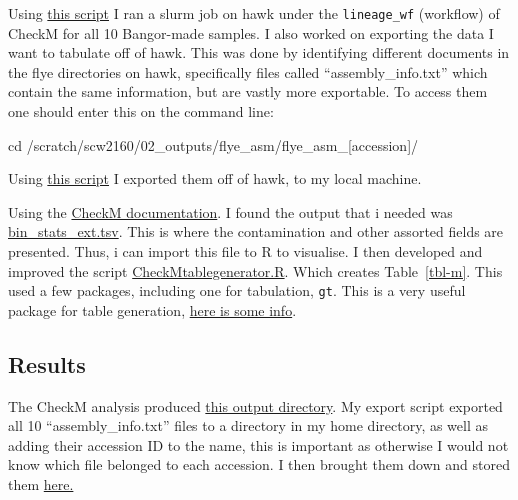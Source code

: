 \documentclass[
  letterpaper,
  DIV=11,
  numbers=noendperiod]{scrreprt}
\begin{document}
Using
\href{https://github.com/tobiasnunn/tnunn_research/blob/6be0be8a1de6b7fd64de79c280d9641f68a0e37c/00_scripts/checkmtest.sh}{this
script} I ran a slurm job on hawk under the \texttt{lineage\_wf}
(workflow) of CheckM for all 10 Bangor-made samples. I also worked on
exporting the data I want to tabulate off of hawk. This was done by
identifying different documents in the flye directories on hawk,
specifically files called ``assembly\_info.txt'' which contain the same
information, but are vastly more exportable. To access them one should
enter this on the command line:

cd /scratch/scw2160/02\_outputs/flye\_asm/flye\_asm\_{[}accession{]}/

Using
\href{https://github.com/tobiasnunn/tnunn_research/blob/6be0be8a1de6b7fd64de79c280d9641f68a0e37c/00_scripts/assemblytabledatagetter.sh}{this
script} I exported them off of hawk, to my local machine.

Using the
\href{https://github.com/Ecogenomics/CheckM/wiki/Genome-Quality-Commands\#qa}{CheckM
documentation}. I found the output that i needed was
\href{https://github.com/tobiasnunn/tnunn_research/blob/0ce45bbddc271c477204cfc7c6d488a9d1d95a87/02_middle-analysis_outputs/CheckM/storage/bin_stats_ext.tsv}{bin\_stats\_ext.tsv}.
This is where the contamination and other assorted fields are presented.
Thus, i can import this file to R to visualise. I then developed and
improved the script
\href{https://github.com/tobiasnunn/tnunn_research/blob/60126045c5802ef0627e86df57e7b533ff568e9d/00_scripts/CheckMtablegenerator.R}{CheckMtablegenerator.R}.
Which creates Table~\ref{tbl-m}. This used a few packages, including one
for tabulation, \texttt{gt}. This is a very useful package for table
generation, \href{https://gt.rstudio.com/}{here is some info}.

\subsection{Results}\label{results}

The CheckM analysis produced
\href{https://github.com/tobiasnunn/tnunn_research/tree/0ce45bbddc271c477204cfc7c6d488a9d1d95a87/02_middle-analysis_outputs/CheckM}{this
output directory}. My export script exported all 10
``assembly\_info.txt'' files to a directory in my home directory, as
well as adding their accession ID to the name, this is important as
otherwise I would not know which file belonged to each accession. I then
brought them down and stored them
\href{https://github.com/tobiasnunn/tnunn_research/tree/6be0be8a1de6b7fd64de79c280d9641f68a0e37c/05_projectdatabase/flyestuff}{here.}
\end{document}
